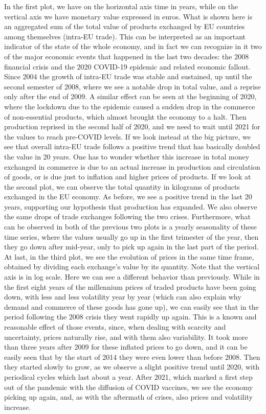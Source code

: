 In the first plot, we have on the horizontal axis time in years, while on the vertical axis we have monetary value expressed in euros. What is shown here is an aggregated sum of the total value of products exchanged by EU countries among themselves (intra-EU trade). This can be interpreted as an important indicator of the state of the whole economy, and in fact we can recognize in it two of the major economic events that happened in the last two decades: the 2008 financial crisis and the 2020 COVID-19 epidemic and related economic fallout. Since 2004 the growth of intra-EU trade was stable and sustained, up until the second semester of 2008, where we see a notable drop in total value, and a reprise only after the end of 2009. A similar effect can be seen at the beginning of 2020, where the lockdown due to the epidemic caused a sudden drop in the commerce of non-essential products, which almost brought the economy to a halt. Then production reprised in the second half of 2020, and we need to wait until 2021 for the values to reach pre-COVID levels.
If we look instead at the big picture, we see that overall intra-EU trade follows a positive trend that has basically doubled the value in 20 years. One has to wonder whether this increase in total money exchanged in commerce is due to an actual increase in production and circulation of goods, or is due just to inflation and higher prices of products. If we look at the second plot, we can observe the total quantity in kilograms of products exchanged in the EU economy. As before, we see a positive trend in the last 20 years, supporting our hypothesis that production has expanded. We also observe the same drops of trade exchanges following the two crises. Furthermore, what can be observed in both of the previous two plots is a yearly seasonality of these time series, where the values usually go up in the first trimester of the year, then they go down after mid-year, only to pick up again in the last part of the period. 
At last, in the third plot, we see the evolution of prices in the same time frame, obtained by dividing each exchange's value by its quantity. Note that the vertical axis is in log scale. Here we can see a different behavior than previously. While in the first eight years of the millennium prices of traded products have been going down, with less and less volatility year by year (which can also explain why demand and commerce of these goods has gone up), we can easily see that in the period following the 2008 crisis they went rapidly up again. This is a known and reasonable effect of those events, since, when dealing with scarcity and uncertainty, prices naturally rise, and with them also variability. It took more than three years after 2009 for these inflated prices to go down, and it can be easily seen that by the start of 2014 they were even lower than before 2008. Then they started slowly to grow, as we observe a  slight positive trend until 2020, with periodical cycles which last about a year. After 2021, which marked a first step out of the pandemic with the diffusion of COVID vaccines, we see the economy picking up again, and, as with the aftermath of crises, also prices and volatility increase.

